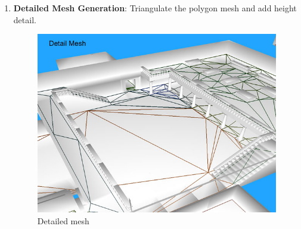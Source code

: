 \documentclass[a4paper,11pt]{article}
\begin{document}
\begin{enumerate}
  
  
  
  
  \item\textbf{Detailed Mesh Generation}: Triangulate the polygon mesh and add height detail.
  
  \begin{figure}[H]
	\centering
	\includegraphics[width=1\textwidth]{stage_detail_mesh.png}
	\caption{Detailed mesh}
\end{figure}  
  
\end{enumerate}
\end{document}
